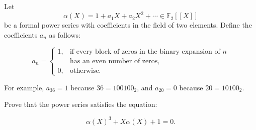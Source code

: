 \begin{problem}
    Let
    \[
        \alpha\left(X\right) = 1 + a_1 X + a_2 X^2 + \cdots \in \mathbb{F}_2\left[\left[X\right]\right]
    \]
    be a formal power series with coefficients in the field of two elements. Define the coefficients \( a_n \) as follows:

    \[
        a_n =
        \begin{cases}
            1, & \text{if every block of zeros in the binary expansion of } n \\
            & \text{has an even number of zeros}, \\
            0, & \text{otherwise}.
        \end{cases}
    \]

    For example, \( a_{36} = 1 \) because \( 36 = 100100_2 \), and \( a_{20} = 0 \) because \( 20 = 10100_2 \).

    Prove that the power series satisfies the equation:

    \[
        \alpha\left(X\right)^3 + X \alpha\left(X\right) + 1 = 0.
    \]
\end{problem}
